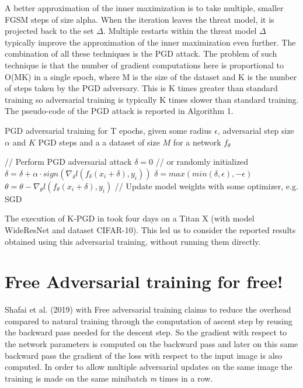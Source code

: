\documentclass{article}
\begin{document}
A better approximation of the inner maximization is to take multiple, smaller FGSM steps of size alpha. When the iteration leaves the threat model, it is projected back to the set $\Delta$. Multiple restarts within the threat model $\Delta$ typically improve the approximation of the inner maximization even further. The combination of all these techniques is the PGD attack. The problem of such technique is that the number of gradient computations here is proportional to O(MK) in a single epoch, where M is the size of the dataset and K is the number of steps taken by the PGD adversary. This is K times greater than standard training so adversarial training is typically K times slower than standard training. The pseudo-code of the PGD attack is reported in Algorithm 1.
\begin{algorithm}[H]
	\caption{PGD adversarial training for T epochs, given some radius $\epsilon$, adversarial step size $\alpha$ and $K$ PGD steps and a a dataset of size $M$ for a network $f_{\theta}$}
	\begin{algorithmic}[1]
		\State// Perform PGD adversarial attack
		\State $\delta = 0$ // or randomly initialized
		\State $\delta = \delta + \alpha\cdot sign(\nabla_{\delta}l(f_{\delta}(x_i + \delta), y_i))$
		\State $\delta = max(min(\delta, \epsilon), -\epsilon)$
		\EndFor
		\State$\theta = \theta - \nabla_{\theta}l(f_{\theta}(x_i + \delta), y_i)$ // Update model weights with some optimizer, e.g. SGD
		\EndFor
		\EndFor
	\end{algorithmic}
\end{algorithm}
The execution of K-PGD in \cite{MadryEtAl2017} took four days on a Titan X (with model WideResNet and dataset CIFAR-10). This led us to consider the reported results obtained using this adversarial training, without running them directly.


\section{Free Adversarial training for free!}

Shafai et al. (2019) with Free adversarial training claims to reduce the overhead compared to natural training through the computation of ascent step by reusing the backward pass needed for the descent step. So the gradient with respect to the network parameters is computed on the backward pass and later on this same backward pass the gradient of the loss with respect to the input image is also computed. In order to allow multiple adversarial updates on the same image the training is made on the same minibatch \textit{m} times in a row. 
\end{document}
